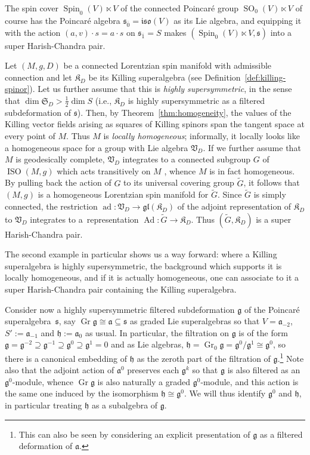\documentclass[11pt]{article}
\numberwithin{equation}{section}
\numberwithin{equation}{section}
\newcommand{\fa}{\mathfrak{a}}
\newcommand{\fg}{\mathfrak{g}}
\newcommand{\fh}{\mathfrak{h}}
\newcommand{\fs}{\mathfrak{s}}
\newcommand{\fgl}{\mathfrak{gl}}
\newcommand{\fiso}{\mathfrak{iso}}
\newcommand{\fK}{\mathfrak{K}}
\newcommand{\fS}{\mathfrak{S}}
\newcommand{\fV}{\mathfrak{V}}
\newcommand{\1}{\mathbbm{1}}
\DeclareMathOperator{\Spin}{Spin}
\DeclareMathOperator{\SO}{SO}
\DeclareMathOperator{\ISO}{ISO}
\DeclareMathOperator{\Ad}{Ad}
\DeclareMathOperator{\ad}{ad}
\DeclareMathOperator{\Gr}{Gr}
\begin{document}
\begin{Example}
The spin cover $\Spin_0(V)\ltimes V$ of the connected Poincar\'e group $\SO_0(V)\ltimes V$ of course has the Poincar\'e algebra $\fs_{\overline 0}=\fiso(V)$ as its Lie algebra, and equipping it with the action $(a,v)\cdot s = a\cdot s$ on $\fs_{\overline 1}=S$ makes $(\Spin_0(V)\ltimes V,\fs)$ into a super Harish-Chandra pair.
\end{Example}

\begin{Example}
Let $(M,g,D)$ be a connected Lorentzian spin manifold with admissible connection and let $\fK_D$ be its Killing superalgebra (see Definition~\ref{def:killing-spinor}). Let us further assume that this is \emph{highly supersymmetric}, in the sense that $\dim\fS_D>\frac{1}{2}\dim S$ (i.e., $\fK_D$ is highly supersymmetric as a filtered subdeformation of $\fs$). Then, by Theorem~\ref{thm:homogeneity}, the values of the Killing vector fields arising as squares of Killing spinors span the tangent space at every point of $M$. Thus $M$ is \emph{locally homogeneous}; informally, it locally looks like a homogeneous space for a group with Lie algebra $\fV_D$. If we further assume that $M$ is geodesically complete, $\fV_D$ integrates to a connected subgroup $G$ of $\ISO(M,g)$ which acts transitively on $M$ \cite[Theorem~2.2]{Stehney1980}, whence $M$ is in fact homogeneous. By pulling back the action of $G$ to its universal covering group $\widetilde{G}$, it follows that $(M,g)$ is a homogeneous Lorentzian spin manifold for $\widetilde{G}$. Since $\widetilde{G}$ is simply connected, the restriction $\ad\colon\fV_D\to\fgl(\fK_D)$ of the adjoint representation of $\fK_D$ to $\fV_D$ integrates to a~representation $\Ad\colon\widetilde{G}\to\fK_D$. Thus $(\widetilde{G},\fK_D)$ is a super Harish-Chandra pair.
\end{Example}

The second example in particular shows us a way forward: where a Killing superalgebra is highly supersymmetric, the background which supports it is locally homogeneous, and if it is actually homogeneous, one can associate to it a super Harish-Chandra pair containing the Killing superalgebra.

Consider now a highly supersymmetric filtered subdeformation $\fg$ of the Poincar\'e superalgebra~$\fs$, say $\Gr\fg\cong\fa\subseteq\fs$ as graded Lie superalgebras so that $V=\fa_{-2}$, $S':=\fa_{-1}$ and $\fh:=\fa_0$ as usual. In particular, the filtration on $\fg$ is of the form $\fg=\fg^{-2}\supseteq\fg^{-1}\supseteq\fg^0\supseteq\fg^1=0$ and as Lie algebras, $\fh=\Gr_0\fg=\fg^0/\fg^1\cong\fg^0$, so there is a canonical embedding of $\fh$ as the zeroth part of the filtration of $\fg$.\footnote{This can also be seen by considering an explicit presentation of $\fg$ as a filtered deformation of $\fa$.}
Note also that the adjoint action of $\fa^0$ preserves each $\fg^k$ so that $\fg$ is also filtered as an $\fg^0$-module, whence $\Gr\fg$ is also naturally a graded $\fg^0$-module, and this action is the same one induced by the isomorphism $\fh\cong\fg^0$. We will thus identify $\fg^0$ and $\fh$, in particular treating $\fh$ as a subalgebra of $\fg$.
\end{document}
